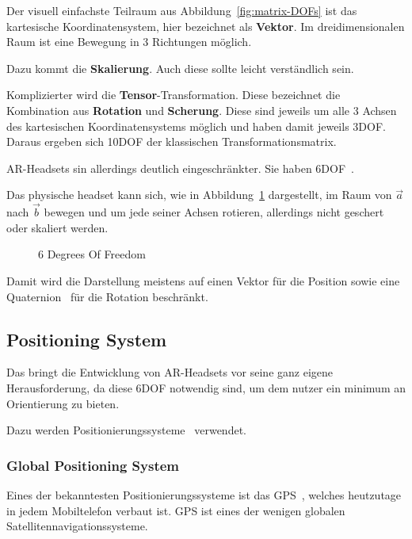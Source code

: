 Der visuell einfachste Teilraum aus Abbildung~\ref{fig:matrix-DOFs} ist das kartesische Koordinatensystem, hier bezeichnet als \textbf{Vektor}.
Im dreidimensionalen Raum ist eine Bewegung in 3 Richtungen möglich.

Dazu kommt die \textbf{Skalierung}.
Auch diese sollte leicht verständlich sein.

Komplizierter wird die \textbf{Tensor}-Transformation.
Diese bezeichnet die Kombination aus \textbf{Rotation} und \textbf{Scherung}.
Diese sind jeweils um alle 3 Achsen des kartesischen Koordinatensystems möglich und haben damit jeweils 3DOF\@.
Daraus ergeben sich 10DOF der klassischen Transformationsmatrix.

AR-Headsets sin allerdings deutlich eingeschränkter.
Sie haben 6DOF~\autocite{wikipedia-contributors-2023B}.

Das physische headset kann sich, wie in Abbildung~\ref{fig:6DOF} dargestellt, im Raum von $\vec{a}$ nach $\vec{b}$ bewegen und um jede seiner Achsen rotieren, allerdings nicht geschert oder skaliert werden.
\begin{figure}[ht!]
    \label{fig:6DOF}
    \center
    
    \caption{6 Degrees Of Freedom~\autocite{wikipedia-contributors-2023B}}
\end{figure}
Damit wird die Darstellung meistens auf einen Vektor für die Position sowie eine Quaternion~\autocite{wikipedia-contributors-2023F} für die Rotation beschränkt.

\subsection{Positioning System}\label{subsec:positioning-system}
Das bringt die Entwicklung von AR-Headsets vor seine ganz eigene Herausforderung, da diese 6DOF notwendig sind, um dem nutzer ein minimum an Orientierung zu bieten.

Dazu werden Positionierungssysteme~\autocite{wikipedia-contributors-2023A} verwendet.

\subsubsection{Global Positioning System}\label{subsubsec:global-positioning-system}
Eines der bekanntesten Positionierungssysteme ist das GPS~\autocite{wikipedia-contributors-2023G}, welches heutzutage in jedem Mobiltelefon verbaut ist.
GPS ist eines der wenigen globalen Satellitennavigationssysteme.


